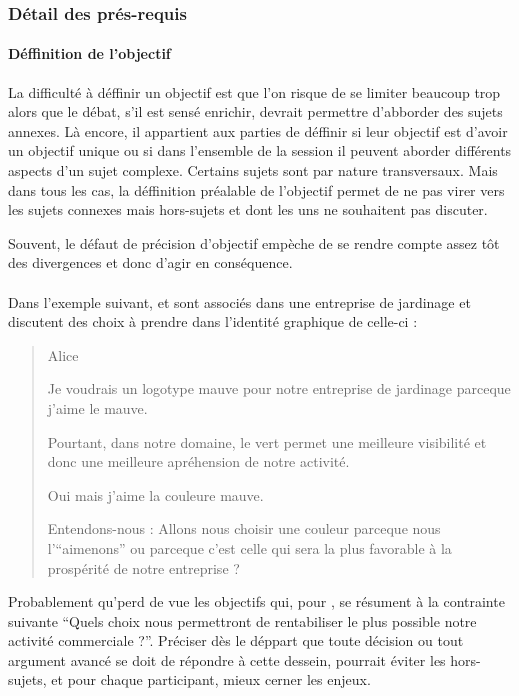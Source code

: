 \subsubsection{Détail des prés-requis}
\paragraph{Déffinition de l’objectif}
La difficulté à déffinir un objectif est que l’on risque de se limiter beaucoup trop alors que le débat, s’il est sensé enrichir, devrait permettre d’abborder des sujets annexes. Là encore, il appartient aux parties de déffinir si leur objectif est d’avoir un objectif unique ou si dans l’ensemble de la session il peuvent aborder différents aspects d’un sujet complexe. Certains sujets sont par nature transversaux. Mais dans tous les cas, la déffinition préalable de l’objectif permet de ne pas virer vers les sujets connexes mais hors-sujets et dont les uns ne souhaitent pas discuter.

Souvent, le défaut de précision d’objectif empèche de se rendre compte assez tôt des divergences et donc d’agir en conséquence.

\paragraph{}
Dans l’exemple suivant, \A et \B sont associés dans une entreprise de jardinage et discutent des choix à prendre dans l’identité graphique de celle-ci :

\begin{quote}
  \begin{drama}{0cm}{0cm}{Alice}

    \Aspeaks Je voudrais un logotype mauve pour notre entreprise de jardinage parceque j’aime le mauve.

    \Bspeaks Pourtant, dans notre domaine, le vert permet une meilleure visibilité et donc une meilleure apréhension de notre activité.

    \Aspeaks Oui mais j’aime la couleure mauve.

    \Bspeaks Entendons-nous : Allons nous choisir une couleur parceque nous l’\enquote{aimenons} ou parceque c’est celle qui sera la plus favorable à la prospérité de notre entreprise ?

  \end{drama}
\end{quote}

Probablement qu’\A perd de vue les objectifs qui, pour \B, se résument à la contrainte suivante \enquote{Quels choix nous permettront de rentabiliser le plus possible notre activité commerciale ?}. Préciser dès le déppart que toute décision ou tout argument avancé se doit de répondre à cette dessein, pourrait éviter les hors-sujets, et pour chaque participant, mieux cerner les enjeux.

